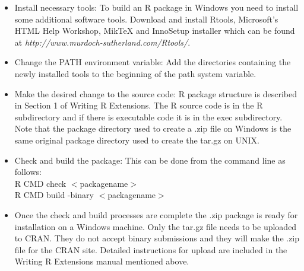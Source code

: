 \documentclass[12pt]{article}
\begin{document}
\begin{itemize}
\item{Install necessary tools: To build an R package in Windows you need to install some additional software tools. Download and install Rtools, Microsoft's HTML Help Workshop, MikTeX and InnoSetup installer which can be found at \emph {http://www.murdoch-sutherland.com/Rtools/}. }
\item{Change the PATH environment variable:
Add the directories containing the newly installed tools to the beginning of the path system variable.}
\item {Make the desired change to the source code: R package structure is described in Section 1 of Writing R Extensions. The R source code is in the R subdirectory and if there is executable code it is in the exec subdirectory. Note that the package directory used to create a .zip file on Windows is the same original package directory used to create the tar.gz on UNIX.}
\item{Check and build the package: This can be done from the command line as follows:\\
R CMD check $<$packagename$>$\\
R CMD build -binary $<$packagename$>$}
\item {Once the check and build processes are complete the .zip package is ready for installation on a Windows machine. Only the tar.gz file needs to be uploaded to CRAN. They do not accept binary submissions and they will make the .zip file for the CRAN site. Detailed
instructions for upload are included in the Writing R Extensions manual mentioned above.}

\end{itemize}
\end{document}

